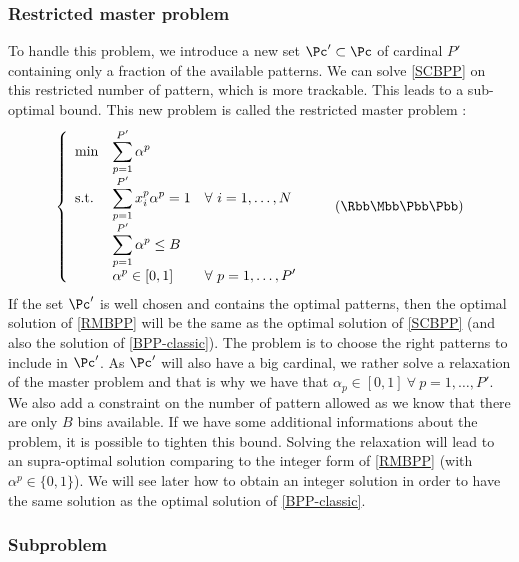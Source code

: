 \subsubsection{Restricted master problem}

To handle this problem, we introduce a new set $\Pc' \subset \Pc$ of cardinal $P'$ containing only a fraction of the available patterns. We can solve \eqref{SCBPP} on this restricted number of pattern, which is more trackable. This leads to a sub-optimal bound. This new problem is called the restricted master problem :
\begin{equation}
	\label{RMBPP}
	\left \{
	\begin{array}{*5{>{\displaystyle}l}}
	\min & \sum_{p=1}^{P'} \alpha^p \\
	\st & \sum_{p=1}^{P'} x_i^p\alpha^p = 1 & \forall \ i = 1,\dots,N \\
	& \sum_{p=1}^{P'} \alpha^p \leq B \\
	& \alpha^{p} \in [0,1] &  \forall \ p = 1,\dots,P'
	\end{array}
	\right.
	\tag{$\Rbb\Mbb\Bbb\Pbb\Pbb$}
\end{equation}
If the set $\Pc'$ is well chosen and contains the optimal patterns, then the optimal solution of \eqref{RMBPP} will be the same as the optimal solution of \eqref{SCBPP} (and also the solution of \eqref{BPP-classic}). The problem is to choose the right patterns to include in $\Pc'$. As $\Pc'$ will also have a big cardinal, we rather solve a relaxation of the master problem and that is why we have that $\alpha_{p} \in [0,1] \ \forall \ p = 1,\dots,P'$. We also add a constraint on the number of pattern allowed as we know that there are only $B$ bins available. If we have some additional informations about the problem, it is possible to tighten this bound. Solving the relaxation will lead to an supra-optimal solution comparing to the integer form of \eqref{RMBPP} (with $ \alpha^{p} \in \{0,1\}$). We will see later how to obtain an integer solution in order to have the same solution as the optimal solution of \eqref{BPP-classic}.

\subsubsection{Subproblem}
\label{subproblem}

